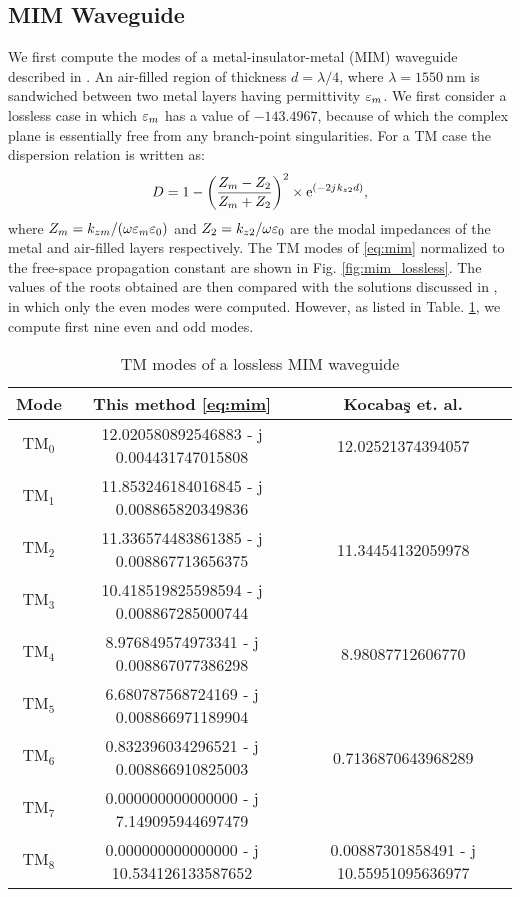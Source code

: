 \subsection{MIM Waveguide}
%
%
We first compute the modes of a metal-insulator-metal (MIM) waveguide described in \cite{Kocabas2009}. An air-filled region of thickness $d = \lambda/4$, where $\lambda = \SI{1550}{\nm}$ is sandwiched between two metal layers having permittivity $\varepsilon_m$. We first consider a lossless case in which $\varepsilon_m$ has a value of $-143.4967$, because of which the complex plane is essentially free from any branch-point singularities. For a TM case the dispersion relation is written as:
%
\begin{equation}
  D =  1 - \left(\frac{Z_m - Z_2}{Z_m + Z_2}\right)^2 \times \mathrm{e}^{(-2{j}\mkern1mu  k_{z2} d)},
  \label{eq:mim}
\end{equation}
%
where $Z_m = k_{zm}/(\omega \varepsilon_m \varepsilon_0)$ and $Z_2 = k_{z2}/{\omega \varepsilon_0}$ are the modal impedances of the metal and air-filled layers respectively. The TM modes of \eqref{eq:mim} normalized to the free-space propagation constant are shown in Fig. \ref{fig:mim_lossless}. The values of the roots obtained are then compared with the solutions discussed in \cite{Kocabas2009}, in which only the even modes were computed. However, as listed in Table. \ref{tab:kocabas_lossless}, we compute first nine even and odd modes.
%
\begin{table}[!htbp]
\begin{center}
 \begin{tabular}{||c |c |c||}
 \hline
 Mode & This method \eqref{eq:mim} & Kocaba{\c{s}} et. al. \cite{Kocabas2009} \\ [0.5ex]
 \hline\hline
 $\text{TM}_0$ & \num{12.020580892546883 - j 0.004431747015808} & \num{12.02521374394057} \\
 $\text{TM}_1$ & \num{11.853246184016845 - j 0.008865820349836} & \num{} \\
 $\text{TM}_2$ & \num{11.336574483861385 - j 0.008867713656375} & \num{11.34454132059978} \\
 $\text{TM}_3$ & \num{10.418519825598594 - j 0.008867285000744} & \num{} \\
 $\text{TM}_4$ & \num{8.976849574973341 - j 0.008867077386298} & \num{8.98087712606770} \\
 $\text{TM}_5$ & \num{6.680787568724169 - j 0.008866971189904} & \num{} \\
 $\text{TM}_6$ & \num{0.832396034296521 - j 0.008866910825003} & \num{0.7136870643968289} \\
 $\text{TM}_7$ & \num{0.000000000000000 - j 7.149095944697479} & \num{} \\
 $\text{TM}_8$ & \num{0.000000000000000 - j 10.534126133587652} & \num{0.00887301858491 - j 10.55951095636977} \\
 \hline
 \end{tabular}
  \end{center}
 \caption{TM modes of a lossless MIM waveguide}
 \label{tab:kocabas_lossless}
\end{table}
%

